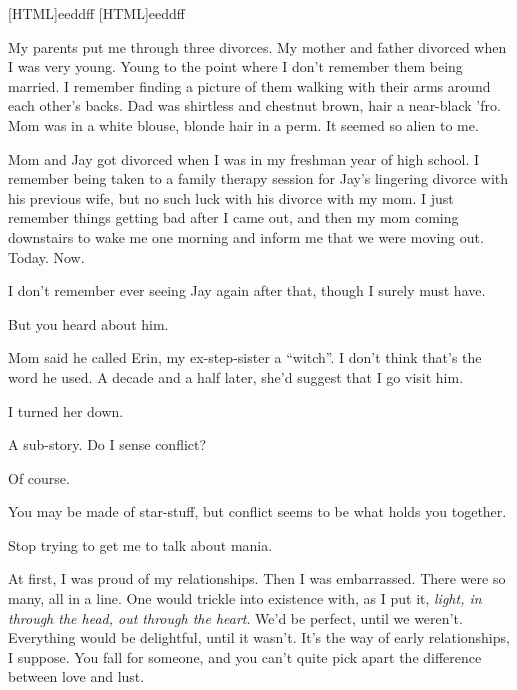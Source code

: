[HTML]{eeddff}
[HTML]{eeddff}
\begin{paracol}{2}
\begin{leftcolumn}

\noindent My parents put me through three divorces. My mother and father divorced when I was very young. Young to the point where I don't remember them being married. I remember finding a picture of them walking with their arms around each other's backs. Dad was shirtless and chestnut brown, hair a near-black 'fro. Mom was in a white blouse, blonde hair in a perm. It seemed so alien to me.

Mom and Jay got divorced when I was in my freshman year of high school. I remember being taken to a family therapy session for Jay's lingering divorce with his previous wife, but no such luck with his divorce with my mom. I just remember things getting bad after I came out, and then my mom coming downstairs to wake me one morning and inform me that we were moving out. Today. Now.

\end{leftcolumn}
\begin{rightcolumn*}
  
\end{rightcolumn*}
\begin{leftcolumn}

I don't remember ever seeing Jay again after that, though I surely must have.

\begin{ally}
But you heard about him.
\end{ally}
Mom said he called Erin, my ex-step-sister a ``witch''. I don't think that's the word he used. A decade and a half later, she'd suggest that I go visit him.

I turned her down.

\begin{ally}
A sub-story. Do I sense conflict?
\end{ally}
Of course.

\begin{ally}
You may be made of star-stuff, but conflict seems to be what holds you together.
\end{ally}
Stop trying to get me to talk about mania.

At first, I was proud of my relationships. Then I was embarrassed. There were so many, all in a line. One would trickle into existence with, as I put it, \emph{light, in through the head, out through the heart}. We'd be perfect, until we weren't. Everything would be delightful, until it wasn't. It's the way of early relationships, I suppose. You fall for someone, and you can't quite pick apart the difference between love and lust.


\end{leftcolumn}
\end{paracol}
